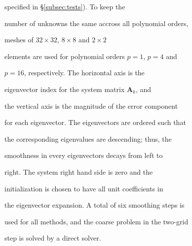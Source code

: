 \documentclass[smallcondensed,final]{svjour3}     %
\begin{document}
\begin{figure}
{          specified in \S\ref{subsec:tests}). To keep the

          number of unknowns the same accross all polynomial orders,

          meshes of $32\times 32$, $8\times 8$ and $2\times 2$

          elements are used for polynomial orders $p=1$, $p=4$ and

          $p=16$, respectively.  The horizontal axis is the

          eigenvector index for the system matrix $\mathbf{A}_k$, and

          the vertical axis is the magnitude of the error component

          for each eigenvector. The eigenvectors are ordered such that

          the corresponding eigenvalues are descending; thus, the

          smoothness in every eigenvectors decays from left to

          right.  The system right hand side is zero and the

          initialization is chosen to have all unit coefficients in

          the eigenvector expansion. A total of six smoothing steps is

          used for all methods, and the coarse problem in the two-grid

          step is solved by a direct solver.}

\end{figure}



\end{document}
